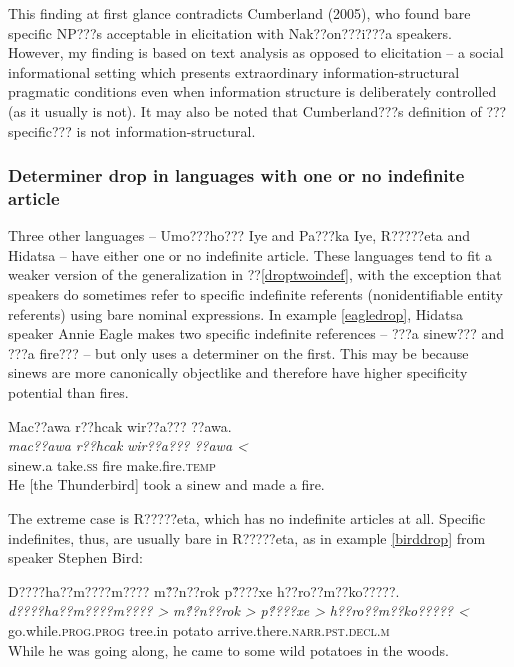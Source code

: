 \documentclass[output=paper]{LSP/langsci}
\begin{document}
This finding at first glance contradicts Cumberland (2005), who found bare specific NP???s acceptable in elicitation with Nak??on???i???a speakers. However, my finding is based on text analysis as opposed to elicitation -- a social informational setting which presents extraordinary information-structural pragmatic conditions even when information structure is deliberately controlled (as it usually is not). It may also be noted that Cumberland???s definition of ???specific??? is not information-structural.

\subsubsection{Determiner drop in languages with one or no indefinite article}\label{droponeindef}

Three other languages -- Umo???ho??? Iye and Pa???ka Iye, R?????eta and Hidatsa -- have either one or no indefinite article. These languages tend to fit a weaker version of the generalization in ??\ref{droptwoindef}, with the exception that speakers do sometimes refer to specific indefinite referents (nonidentifiable entity referents) using bare nominal expressions. In example \ref{eagledrop}, Hidatsa speaker Annie Eagle makes two specific indefinite references -- ???a sinew??? and ???a fire??? -- but only uses a determiner on the first. This may be because sinews are more canonically objectlike and therefore have higher specificity potential than fires.

\ea\label{eagledrop}
Mac??awa r??hcak wir??a??? ??awa.\footnotemark\\
\gll	\emph{mac??awa} 	\emph{r??hcak} 	\emph{wir??a???}	\emph{??awa <}\\
	sinew.a 		take.\textsc{ss} 	fire 			make.fire.\textsc{temp}\\
\glt	He [the Thunderbird] took a sinew and made a fire.
\z

The extreme case is R?????eta, which has no indefinite articles at all. Specific indefinites, thus, are usually bare in R?????eta, as in example \ref{birddrop} from speaker Stephen Bird:

\ea\label{birddrop}
D????ha??m????m???? m\'{??}n??rok p\'{??}??xe h??ro??m??ko?????.\footnotemark\\
\gll	\emph{d????ha??m????m???? >}		\emph{m\'{??}n??rok >}	\emph{p\'{??}??xe >}	\emph{h??ro??m??ko????? <}\\
	go.while.\textsc{prog.prog} 	tree.in 			potato 		arrive.there.\textsc{narr.pst.decl.m}\\
\glt	While he was going along, he came to some wild potatoes in the woods.
\z
\end{document}
